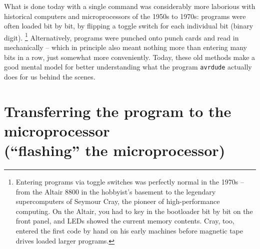 \documentclass[a4paper,12pt]{article}
\begin{document}
What is done today with a single command was considerably more laborious with
historical computers and microprocessors of the 1950s to 1970s:
programs were often loaded bit by bit, by flipping a toggle switch for each
individual bit (binary digit).
\footnote{Entering programs via toggle switches was perfectly normal in the
1970s – from the Altair 8800 in the hobbyist's basement to the legendary
supercomputers of Seymour Cray, the pioneer of high-performance computing.
On the Altair, you had to key in the bootloader bit by bit on the front
panel, and LEDs showed the current memory contents. Cray, too, entered the
first code by hand on his early machines before magnetic tape drives loaded
larger programs.}
Alternatively, programs were punched onto punch cards and read in
mechanically – which in principle also meant nothing more than entering many
bits in a row, just somewhat more conveniently.
Today, these old methods make a good mental model for better understanding
what the program \texttt{avrdude} actually does for us behind the scenes.

\newpage

\section[Transferring the program to the microprocessor (``flashing'' the microprocessor)]{%
    Transferring the program to the microprocessor\\
    (``flashing'' the microprocessor)%
}
\end{document}
